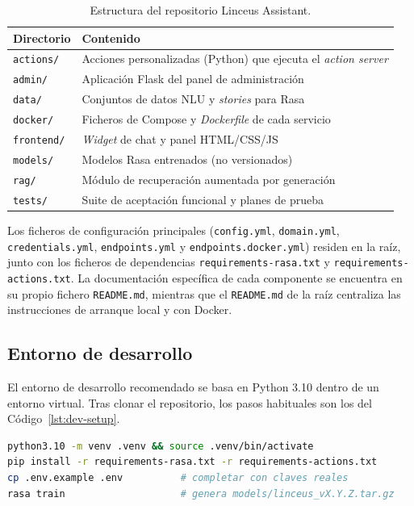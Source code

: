 \begin{table}[hbtp]
\centering
\caption{Estructura del repositorio Linceus Assistant.}\label{tab:desarrollo-estructura}
\begin{tabular}{ll}
\hline
\textbf{Directorio} & \textbf{Contenido} \\
\hline
\texttt{actions/} & Acciones personalizadas (Python) que ejecuta el \textit{action server} \\
\texttt{admin/} & Aplicación Flask del panel de administración \\
\texttt{data/} & Conjuntos de datos NLU y \textit{stories} para Rasa \\
\texttt{docker/} & Ficheros de Compose y \textit{Dockerfile} de cada servicio \\
\texttt{frontend/} & \textit{Widget} de chat y panel HTML/CSS/JS \\
\texttt{models/} & Modelos Rasa entrenados (no versionados) \\
\texttt{rag/} & Módulo de recuperación aumentada por generación \\
\texttt{tests/} & Suite de aceptación funcional y planes de prueba \\
\hline
\end{tabular}
\end{table}

Los ficheros de configuración principales (\texttt{config.yml}, \texttt{domain.yml}, \texttt{credentials.yml}, \texttt{endpoints.yml} y \texttt{endpoints.docker.yml}) residen en la raíz, junto con los ficheros de dependencias \texttt{requirements-rasa.txt} y \texttt{requirements-actions.txt}. La documentación específica de cada componente se encuentra en su propio fichero \texttt{README.md}, mientras que el \texttt{README.md} de la raíz centraliza las instrucciones de arranque local y con Docker.

\subsection{Entorno de desarrollo}\label{subsec:desarrollo-entorno}

El entorno de desarrollo recomendado se basa en Python 3.10 dentro de un entorno virtual. Tras clonar el repositorio, los pasos habituales son los del Código~\ref{lst:dev-setup}.

\begin{lstlisting}[language=bash, caption={Preparacion del entorno de desarrollo local.}, label={lst:dev-setup}]
python3.10 -m venv .venv && source .venv/bin/activate
pip install -r requirements-rasa.txt -r requirements-actions.txt
cp .env.example .env          # completar con claves reales
rasa train                    # genera models/linceus_vX.Y.Z.tar.gz
\end{lstlisting}

